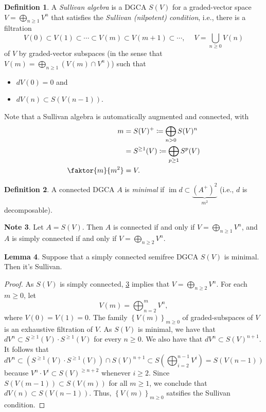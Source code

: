 \documentclass[10pt,letterpaper,cm]{nupset}
\theoremstyle{definition}
\newtheorem{defn}{Definition}[subsection]
\newtheorem{note}[defn]{Note}
\theoremstyle{theorem}
\newtheorem{lemma}[defn]{Lemma}
\theoremstyle{remark}
\newcommand{\1}{\mathbb{1}}
\newcommand{\0}{\vec 0}
\DeclareMathOperator{\im}{im}
\newcommand{\bi}{\begin{itemize}}
\newcommand{\ei}{\end{itemize}}
\begin{document}
\begin{defn}\label{sullalg}
A \textit{Sullivan algebra} is a DGCA $S(V)$ for a graded-vector space $V = \bigoplus_{n \geq 1}V^n$ that satisfies the \textit{Sullivan (nilpotent) condition}, i.e., there is a filtration
\[
V(0) \subset V(1) \subset \cdots \subset V(m) \subset V(m+1) \subset \cdots, \ \quad V = \bigcup_{n\geq 0}V(n)
\] of $V$ by graded-vector subspaces (in the sense that $V(m) = \bigoplus_{n\geq 1}\left(V(m) \cap V^n\right)$) such that
\bi
\item $d{V(0)} = 0$ and
\item $d{V(n)} \subset S(V(n-1))$.
\ei 
\end{defn}

\smallskip

Note that a Sullivan algebra is automatically augmented and connected, with 
\begin{align*}
m & = S(V)^+ 
 \coloneqq \bigoplus_{n >0}S(V)^n
\\ &  = S^{\geq 1}(V)
 \coloneqq \bigoplus_{p \geq 1}S^p(V)
\\ \faktor{m}{m^2} & = V
.
\end{align*}


\begin{defn}
A connected DGCA $A$ is \textit{minimal} if $\im{d} \subset \underbrace{\left(A^+\right)^2}_{m^2} $ (i.e., $d$ is decomposable).
\end{defn}

\begin{note}\label{conn}
Let $A= S(V)$. Then $A$ is connected if and only if $V = \bigoplus_{n \geq 1}V^n$, and $A$ is simply connected if and only if $V = \bigoplus_{n \geq 2}V^n$.
\end{note}

\begin{lemma}\label{suffc}
Suppose that a simply connected semifree DGCA $S(V)$ is minimal. Then it's Sullivan. 
\end{lemma}
\begin{proof}
As $S(V)$ is simply connected, \cref{conn} implies that $V = \bigoplus_{n \geq 2} V^n$. For each $m\geq 0$, let 
\[
V(m) = \bigoplus_{n =2}^m V^n,
\]
where $V(0) = V(1) =0$.
The family $\left\{V(m)\right\}_{m \geq 0}$ of graded-subspaces of $V$ is an exhaustive filtration of $V$. As $S(V)$ is minimal, we have that $d{V^n} \subset S^{\geq 1}(V) \cdot S^{\geq 1}(V)$ for every $n \geq 0$. We also have that $d{V^n} \subset S(V)^{n+1}$. It follows that
\[
d{V^n} \subset  \left(S^{\geq 1}(V) \cdot S^{\geq 1}(V)\right) \cap S(V)^{n+1} \subset S\left(\bigoplus_{i=2}^{n-1}V^i\right) = S(V(n-1))
\]  because $V^n \cdot V^i \subset S(V)^{\geq n+2}$ whenever $i\geq 2$. Since $S(V(m-1)) \subset S(V(m))$ for all $m \geq 1$, we conclude that $d{V(n)} \subset S(V(n-1))$. Thus,  $\left\{V(m)\right\}_{m \geq 0}$ satsifies the Sullivan condition.
\end{proof}
\end{document}
